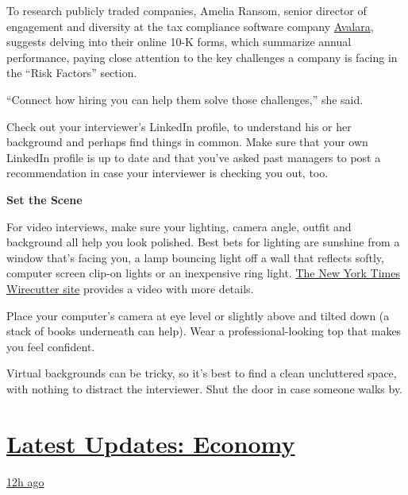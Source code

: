 To research publicly traded companies, Amelia Ransom, senior director of
engagement and diversity at the tax compliance software company
\href{https://www.avalara.com/us/en/index.html}{Avalara}, suggests
delving into their online 10-K forms, which summarize annual
performance, paying close attention to the key challenges a company is
facing in the ``Risk Factors'' section.

``Connect how hiring you can help them solve those challenges,'' she
said.

Check out your interviewer's LinkedIn profile, to understand his or her
background and perhaps find things in common. Make sure that your own
LinkedIn profile is up to date and that you've asked past managers to
post a recommendation in case your interviewer is checking you out, too.

\textbf{Set the Scene}

For video interviews, make sure your lighting, camera angle, outfit and
background all help you look polished. Best bets for lighting are
sunshine from a window that's facing you, a lamp bouncing light off a
wall that reflects softly, computer screen clip-on lights or an
inexpensive ring light.
\href{https://www.nytimes.com/wirecutter/blog/video-call-lighting-tips/}{The
New York Times Wirecutter site} provides a video with more details.

Place your computer's camera at eye level or slightly above and tilted
down (a stack of books underneath can help). Wear a professional-looking
top that makes you feel confident.

Virtual backgrounds can be tricky, so it's best to find a clean
uncluttered space, with nothing to distract the interviewer. Shut the
door in case someone walks by.

\hypertarget{latest-updates-economy}{%
\section{\texorpdfstring{\href{https://www.nytimes.com/live/2020/08/03/business/stock-market-today-coronavirus?action=click\&pgtype=Article\&state=default\&region=MAIN_CONTENT_1\&context=storylines_live_updates}{Latest
Updates:
Economy}}{Latest Updates: Economy}}\label{latest-updates-economy}}

\href{https://www.nytimes.com/live/2020/08/03/business/stock-market-today-coronavirus?action=click\&pgtype=Article\&state=default\&region=MAIN_CONTENT_1\&context=storylines_live_updates\#the-chicago-fed-president-says-its-up-to-congress-to-save-the-economy}{12h
ago}


